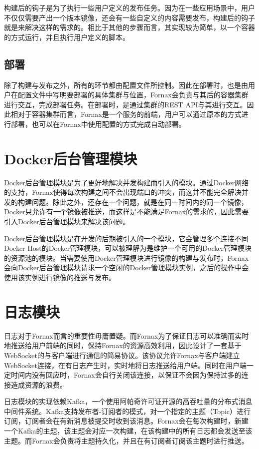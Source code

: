 构建后的钩子是为了执行一些用户定义的发布任务。因为在一些应用场景中，用户不仅仅需要产出一个版本镜像，还会有一些自定义的内容需要发布，构建后的钩子就是来解决这样的需求的。相比于其他的步骤而言，其实现较为简单，以一个容器的方式运行，并且执行用户定义的脚本。

\subsection{部署}

除了构建与发布之外，所有的环节都由配置文件所控制。因此在部署时，也是由用户在配置文件中写明要部署的具体集群与位置，Fornax会负责与其后的容器集群进行交互，完成部署任务。在部署时，是通过集群的REST API与其进行交互。因此相对于容器集群而言，Fornax是一个服务的前端，用户可以通过原本的方式进行部署，也可以在Fornax中使用配置的方式完成自动部署。

\section{Docker后台管理模块}

Docker后台管理模块是为了更好地解决并发构建而引入的模块。通过Docker网络的支持，Fornax使得每次构建之间不会出现端口的冲突，而这并不能完全解决并发的构建问题。除此之外，还存在一个问题，就是在同一时间内的同一个镜像，Docker只允许有一个镜像被推送，而这样是不能满足Fornax的需求的，因此需要引入Docker后台管理模块来解决该问题。

Docker后台管理模块是在开发的后期被引入的一个模块，它会管理多个连接不同Docker Host的Docker管理模块，可以被理解为是维护一个可用的Docker管理模块的资源池的模块。当需要使用Docker管理模块进行镜像的构建与发布时，Fornax会向Docker后台管理模块请求一个空闲的Docker管理模块实例，之后的操作中会使用该实例进行镜像的推送与发布。

\section{日志模块}

日志对于Fornax而言的重要性毋庸置疑。而Fornax为了保证日志可以准确而实时地推送给用户前端的同时，保持Fornax的资源高效利用，因此设计了一套基于WebSocket的与客户端进行通信的简易协议。该协议允许Fornax与客户端建立WebSocket连接，在有日志产生时，实时地将日志推送给用户端。同时在用户端一定时间内没有回应时，Fornax会自行关闭该连接，以保证不会因为保持过多的连接造成资源的浪费。

日志模块的实现依赖Kafka，一个使用阿帕奇许可证开源的高吞吐量的分布式消息中间件系统。Kafka支持发布者-订阅者的模式，对一个指定的主题（Topic）进行订阅，订阅者会在有新消息被提交时收到该消息。Fornax会在每次构建时，新建一个Kafka的主题，该主题会对应一次构建，在该构建中的所有日志都会发送至该主题。而Fornax会负责将主题持久化，并且在有订阅者订阅该主题时进行推送。


